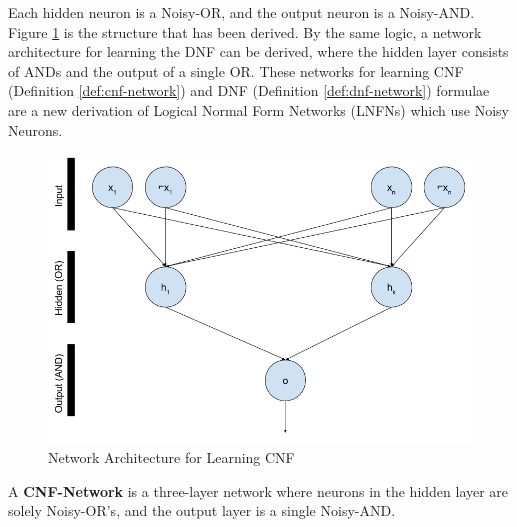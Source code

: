 \noindent
\begin{minipage}[t]{0.35\textwidth}
	\vspace{0px}
\hspace{0.0\textwidth}
Each hidden neuron is a Noisy-OR, and the output neuron is a Noisy-AND. Figure \ref{fig:cnf-network-structure} is the structure that has been derived. By the same logic, a network architecture for learning the DNF can be derived, where the hidden layer consists of ANDs and the output of a single OR. These networks for learning CNF (Definition \ref{def:cnf-network}) and DNF (Definition \ref{def:dnf-network}) formulae are a new derivation of Logical Normal Form Networks (LNFNs) \cite{herrmann1996backpropagation} which use Noisy Neurons.
\end{minipage}
\hspace{0.045\textwidth}
\begin{minipage}[t]{0.55\textwidth}
	\vspace{0px}
	\begin{figure}[H]
	\centering
	\begin{minipage}[b]{1.0\textwidth}
		\includegraphics[width=\textwidth]{CNF-Network-Structure.png}
		\caption{Network Architecture for Learning CNF}
		\label{fig:cnf-network-structure}
	\end{minipage}
	\hfill
\end{figure}
\end{minipage}

\theoremstyle{definition}
\begin{definition} \label{def:cnf-network}
A \textbf{CNF-Network} is a three-layer network where neurons in the hidden layer are solely Noisy-OR's, and the output layer is a single Noisy-AND. 
\end{definition}


